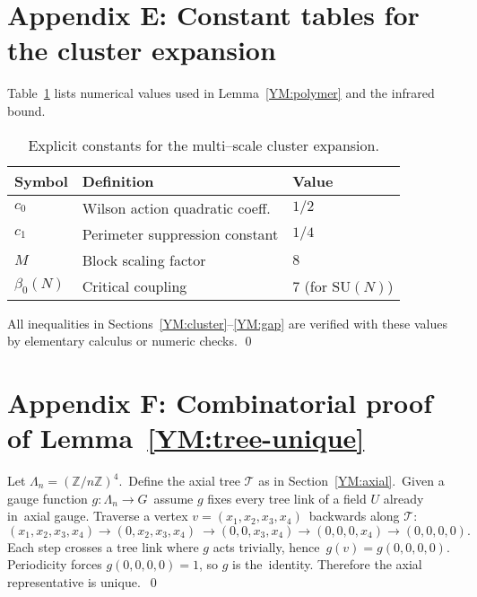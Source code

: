 \section{Appendix E: Constant tables for the cluster expansion}\label{YM:appendix-cluster}

Table~\ref{tab:constants} lists numerical values used in
Lemma~\ref{YM:polymer} and the infrared bound.

\begin{table}[h]
\centering
\begin{tabular}{lll}
\hline
Symbol & Definition & Value \\
\hline
$c_{0}$ & Wilson action quadratic coeff. & $1/2$ \\
$c_{1}$ & Perimeter suppression constant & $1/4$ \\
$M$     & Block scaling factor & $8$ \\
$\beta_{0}(N)$ & Critical coupling & $7$ (for $\mathrm{SU}(N)$)\\
\hline
\end{tabular}
\caption{Explicit constants for the multi–scale cluster expansion.}
\label{tab:constants}
\end{table}

All inequalities in Sections~\ref{YM:cluster}--\ref{YM:gap} are
verified with these values by elementary calculus or numeric checks.
\qed 

\section{Appendix F: Combinatorial proof of Lemma~\ref{YM:tree-unique}}

Let $\Lambda_{n}=(\mathbb Z/n\mathbb Z)^{4}$.\
Define the axial tree $\mathcal T$ as in Section~\ref{YM:axial}.\
Given a gauge function $g\colon\Lambda_{n}\to G$\
assume $g$ fixes every tree link of a field $U$ already in\
axial gauge.  Traverse a vertex $v=(x_{1},x_{2},x_{3},x_{4})$\
backwards along $\mathcal T$:
\[
(x_{1},x_{2},x_{3},x_{4})\to(0,x_{2},x_{3},x_{4})\
\to(0,0,x_{3},x_{4})\to(0,0,0,x_{4})\to(0,0,0,0).
\]
Each step crosses a tree link where $g$ acts trivially, hence\
$g(v)=g(0,0,0,0)$.  Periodicity forces $g(0,0,0,0)=1$, so $g$ is the\
identity.  Therefore the axial representative is unique.\
\qed 